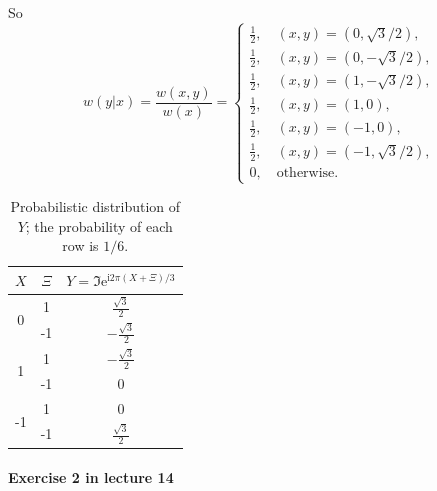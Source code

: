 \documentclass[hyperref, a4paper]{article}
\newcommand*{\ii}{\mathrm{i}}
\newcommand*{\ee}{\mathrm{e}}
\begin{document}
So 
\begin{equation}
    w(y | x) = \frac{w(x, y)}{w(x)} = 
    \begin{cases}
        \frac{1}{2}, \quad (x, y) = (0, \sqrt{3} /2), \\
        \frac{1}{2}, \quad (x, y) = (0, - \sqrt{3} / 2), \\
        \frac{1}{2}, \quad (x, y) = (1, - \sqrt{3} / 2), \\
        \frac{1}{2}, \quad (x, y) = (1, 0), \\
        \frac{1}{2}, \quad (x, y) = (-1, 0), \\
        \frac{1}{2}, \quad (x, y) = (-1, \sqrt{3}/2), \\
        0, \quad \text{otherwise}.
    \end{cases}
\end{equation}

\begin{table}
    \centering
    \caption{Probabilistic distribution of $Y$; the probability of each row is $1/6$.}
    \label{tbl:prob-y}

    \begin{tabular}{ccc}
    \toprule
    $X$                 & $\Xi$ & $Y = \Im \ee^{\ii 2 \pi(X+\Xi) / 3}$ \\ \midrule
    \multirow{2}{*}{0}  & 1     & $\frac{\sqrt{3}}{2}$                 \\
                        & -1    & $-\frac{\sqrt{3}}{2}$                \\ \midrule
    \multirow{2}{*}{1}  & 1     & $-\frac{\sqrt{3}}{2}$                \\
                        & -1    & $0$                                  \\ \midrule
    \multirow{2}{*}{-1} & 1     & $0$                                  \\
                        & -1    & $\frac{\sqrt{3}}{2}$                 \\ \bottomrule 
    \end{tabular}
\end{table}

\paragraph{Exercise 2 in lecture 14}
\end{document}
